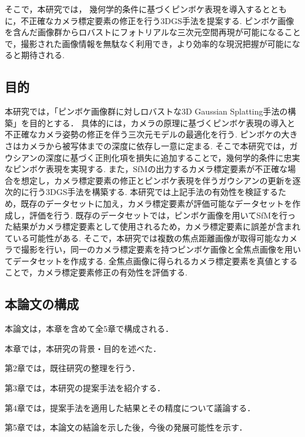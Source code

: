 そこで，本研究では， 幾何学的条件に基づくピンボケ表現を導入するとともに，不正確なカメラ標定要素の修正を行う3DGS手法を提案する.
ピンボケ画像を含んだ画像群からロバストにフォトリアルな三次元空間再現が可能になることで，撮影された画像情報を無駄なく利用でき，より効率的な現況把握が可能になると期待される.\par

\subsection{目的}\label{subsec:objective}

本研究では，「ピンボケ画像群に対しロバストな3D Gaussian Splatting手法の構築」を目的とする．
具体的には，カメラの原理に基づくピンボケ表現の導入と不正確なカメラ姿勢の修正を伴う三次元モデルの最適化を行う.
ピンボケの大きさはカメラから被写体までの深度に依存し一意に定まる.
そこで本研究では，ガウシアンの深度に基づく正則化項を損失に追加することで，幾何学的条件に忠実なピンボケ表現を実現する.
また，SfMの出力するカメラ標定要素が不正確な場合を想定し，カメラ標定要素の修正とピンボケ表現を伴うガウシアンの更新を逐次的に行う3DGS手法を構築する.
本研究では上記手法の有効性を検証するため，既存のデータセットに加え，カメラ標定要素が評価可能なデータセットを作成し，評価を行う.
既存のデータセットでは，ピンボケ画像を用いてSfMを行った結果がカメラ標定要素として使用されるため，カメラ標定要素に誤差が含まれている可能性がある.
そこで，本研究では複数の焦点距離画像が取得可能なカメラで撮影を行い，同一のカメラ標定要素を持つピンボケ画像と全焦点画像を用いてデータセットを作成する.
全焦点画像に得られるカメラ標定要素を真値とすることで，カメラ標定要素修正の有効性を評価する.

\subsection{本論文の構成}\label{subsec:construction}

本論文は，本章を含めて全5章で構成される．

本章では，本研究の背景・目的を述べた．

第2章では，既往研究の整理を行う．

第3章では，本研究の提案手法を紹介する．

第4章では，提案手法を適用した結果とその精度について議論する．

第5章では，本論文の結論を示した後，今後の発展可能性を示す．